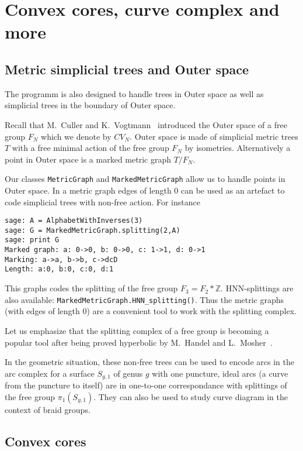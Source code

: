 \documentclass[10pt,a4paper]{article}
\newcommand{\FN}{F_N}
\newcommand{\CVN}{CV_N}
\begin{document}
\section{Convex cores, curve complex and more}

\subsection{Metric simplicial trees  and Outer space}

The programm is also designed to handle trees in Outer space as well
as simplicial trees in the boundary of Outer space.

Recall that M.~Culler and K.~Vogtmann~\cite{cv-moduli} introduced the Outer
space of a free group $\FN$
which we denote by $\CVN$.
Outer space is made of simplicial metric trees $T$
with a free minimal action of the free group $\FN$
by isometries. Alternatively a point in Outer space is a marked metric
graph $T/\FN$.

Our classes \texttt{MetricGraph} and \texttt{MarkedMetricGraph} allow
us to handle points in Outer space. In a metric graph edges of length
$0$
can be used as an artefact to code simplicial trees with non-free
action. For instance 
\begin{verbatim}
sage: A = AlphabetWithInverses(3)
sage: G = MarkedMetricGraph.splitting(2,A)
sage: print G
Marked graph: a: 0->0, b: 0->0, c: 1->1, d: 0->1
Marking: a->a, b->b, c->dcD
Length: a:0, b:0, c:0, d:1
\end{verbatim}
This graphs codes the splitting of the free group $F_3=F_2*\mathbb Z$.
HNN-splittings are also available:
\texttt{MarkedMetricGraph.HNN\_splitting()}. Thus the metric graphs
(with edges of length $0$)
are a convenient tool to work with the splitting complex.

Let us emphasize that the splitting complex of a free group is
becoming a popular tool after being proved hyperbolic by M.~Handel and
L.~Mosher~\cite{hm-fs-hyperbolic}.

In the geometric situation, these non-free trees can be used to encode arcs in the arc complex
for a surface $S_{g,1}$
of genus $g$
with one puncture, ideal arcs (a curve from the puncture to itself)
are in one-to-one correspondance with splittings of the free group
$\pi_1(S_{g,1})$. They can also be used to study curve diagram in the context of braid groups.

\subsection{Convex cores}
\end{document}
